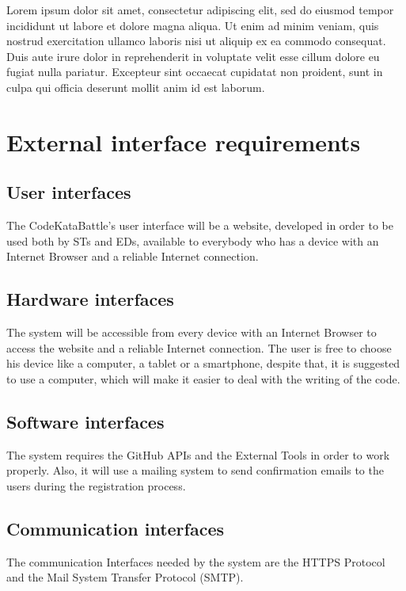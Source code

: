 Lorem ipsum dolor sit amet, consectetur adipiscing elit, sed do eiusmod tempor incididunt ut labore et dolore magna aliqua. Ut enim ad minim veniam, quis nostrud exercitation ullamco laboris nisi ut aliquip ex ea commodo consequat. Duis aute irure dolor in reprehenderit in voluptate velit esse cillum dolore eu fugiat nulla pariatur. Excepteur sint occaecat cupidatat non proident, sunt in culpa qui officia deserunt mollit anim id est laborum.

\newpage

\section{External interface requirements}
\label{sec:external_interface_requirements}%

\subsection{User interfaces}
\label{subsec:user_interfaces}%
The CodeKataBattle’s user interface will be a website, developed in order to be used both by STs and EDs, available to everybody who has a device with an Internet Browser and a reliable Internet connection.

\subsection{Hardware interfaces}
\label{subsec:hardware_interfaces}%
The system will be accessible from every device with an Internet Browser to access the website and a reliable Internet connection.
The user is free to choose his device like a computer, a tablet or a smartphone, despite that, it is suggested to use a computer, which will make it easier to deal with the writing of the code.


\subsection{Software interfaces}
\label{subsec:software_interfaces}%
The system requires the GitHub APIs and the External Tools in order to work properly. Also, it will use a mailing system to send confirmation emails to the users during the registration process.    

\subsection{Communication interfaces}
\label{subsec:communication_interfaces}%
The communication Interfaces needed by the system are the HTTPS Protocol and the Mail System Transfer Protocol (SMTP).

